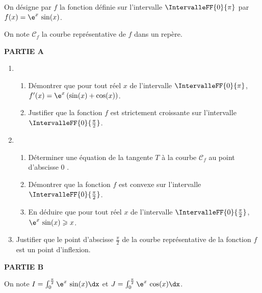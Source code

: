 On désigne par $f$ la fonction définie sur l'intervalle $\IntervalleFF{0}{\pi}$ par $f(x)=\e^{x}\,\sin (x)$.

On note $\mathcal{C}_{f}$ la courbe représentative de $f$ dans un repère.

\medskip

\textbf{PARTIE A}

\begin{enumerate}
	\item
	\begin{enumerate}
		\item Démontrer que pour tout réel $x$ de l'intervalle $\IntervalleFF{0}{\pi}$, $f^{\prime}(x)=\e^{x}\,(\sin (x)+\cos (x))$.
		\item Justifier que la fonction $f$ est strictement croissante sur l'intervalle $\IntervalleFF{0}{\frac{\pi}{2}}$.
	\end{enumerate}
	\item
	\begin{enumerate}
		\item Déterminer une équation de la tangente $T$ à la courbe $\mathcal{C}_{f}$ au point d'abscisse 0 .
		\item Démontrer que la fonction $f$ est convexe sur l'intervalle $\IntervalleFF{0}{\frac{\pi}{2}}$.
		\item En déduire que pour tout réel $x$ de l'intervalle $\IntervalleFF{0}{\frac{\pi}{2}}$, $\e^{x}\,\sin (x) \geqslant x$.
	\end{enumerate}
	\item Justifier que le point d'abscisse $\frac{\pi}{2}$ de la courbe représentative de la fonction $f$ est un point d'inflexion.
\end{enumerate}

\textbf{PARTIE B}

\medskip

On note $I=\int_{0}^{\frac{\pi}{2}} \e^{x}\,\sin (x) \dx$ et $J=\int_{0}^{\frac{\pi}{2}} \e^{x}\,\cos(x) \dx$.

